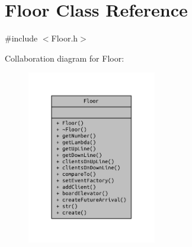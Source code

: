 \section{Floor Class Reference}
\label{class_floor}


{\ttfamily \#include $<$Floor.\+h$>$}



Collaboration diagram for Floor\+:
\nopagebreak
\begin{figure}[H]
\begin{center}
\leavevmode
\includegraphics[width=160pt]{class_floor__coll__graph}
\end{center}
\end{figure}
